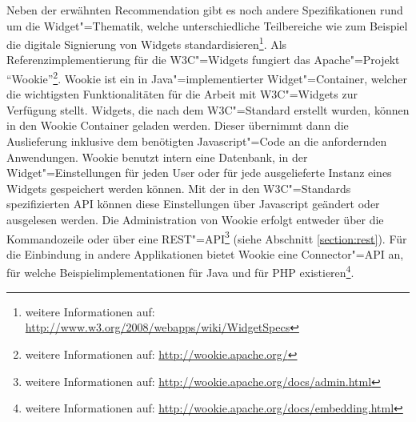 Neben der erwähnten Recommendation gibt es noch andere Spezifikationen rund um die Widget"=Thematik, welche unterschiedliche Teilbereiche wie zum Beispiel die digitale Signierung von Widgets standardisieren\footnote{weitere Informationen auf: \url{http://www.w3.org/2008/webapps/wiki/WidgetSpecs}}. Als Referenzimplementierung für die W3C"=Widgets fungiert das Apache"=Projekt "`Wookie"'\footnote{weitere Informationen auf: \url{http://wookie.apache.org/}}. Wookie ist ein in Java"=implementierter Widget"=Container, welcher die wichtigsten Funktionalitäten für die Arbeit mit W3C"=Widgets zur Verfügung stellt. Widgets, die nach dem W3C"=Standard erstellt wurden, können in den Wookie Container geladen werden. Dieser übernimmt dann die Auslieferung inklusive dem benötigten Javascript"=Code an die anfordernden Anwendungen. Wookie benutzt intern eine Datenbank, in der Widget"=Einstellungen für jeden User oder für jede ausgelieferte Instanz eines Widgets gespeichert werden können. Mit der in den W3C"=Standards spezifizierten API können diese Einstellungen über Javascript geändert oder ausgelesen werden. Die Administration von Wookie erfolgt entweder über die Kommandozeile oder über eine REST"=API\footnote{weitere Informationen auf: \url{http://wookie.apache.org/docs/admin.html}} (siehe Abschnitt \ref{section:rest}). Für die Einbindung in andere Applikationen bietet Wookie eine Connector"=API an, für welche Beispielimplementationen für Java und für PHP existieren\footnote{weitere Informationen auf: \url{http://wookie.apache.org/docs/embedding.html}}.

